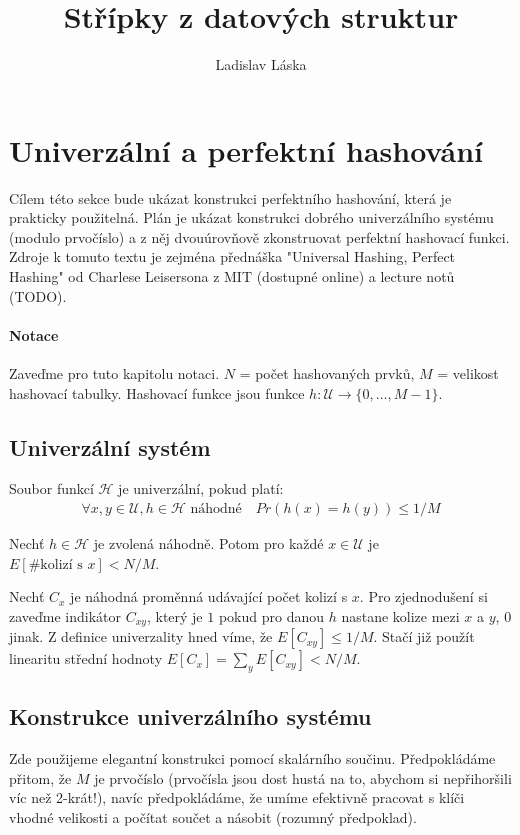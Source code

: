 \documentclass{article}
\begin{document}
\title{Střípky z datových struktur}
\author{Ladislav Láska}

\renewcommand{\H}{\mathcal{H}}
\newcommand{\U}{\mathcal{U}}

\maketitle

\section{Univerzální a perfektní hashování}
Cílem této sekce bude ukázat konstrukci perfektního hashování, která je 
prakticky použitelná. Plán je ukázat konstrukci dobrého univerzálního systému 
(modulo prvočíslo) a z něj dvouúrovňově zkonstruovat perfektní hashovací funkci.  
Zdroje k tomuto textu je zejména přednáška "Universal Hashing, Perfect Hashing" 
od Charlese Leisersona z MIT (dostupné online) a lecture notů (TODO).

\paragraph{Notace} Zaveďme pro tuto kapitolu notaci. $N$ = počet hashovaných 
prvků, $M$ = velikost hashovací tabulky. Hashovací funkce jsou funkce $h: \U \to 
\{0, \dots, M-1\}$.

\subsection{Univerzální systém}
\df Soubor funkcí $\H$ je univerzální, pokud platí:
\begin{align}
	\forall x,y\in \U, h\in \H \text{ náhodné}\quad Pr(h(x) = h(y)) \leq 1/M
\end{align}

\vt Nechť $h\in \H$ je zvolená náhodně. Potom pro každé $x\in \U$ je 
$E[\#\text{kolizí s } x] < N/M$.

\dk Nechť $C_x$ je náhodná proměnná udávající počet kolizí s $x$. Pro 
zjednodušení si zaveďme indikátor $C_{xy}$, který je $1$ pokud pro danou $h$ 
nastane kolize mezi $x$ a $y$, $0$ jinak. Z definice univerzality hned víme, že 
$E[C_{xy}] \leq 1/M$. Stačí již použít linearitu střední hodnoty $E[C_x] = 
\sum_y E[C_{xy}] < N/M$.

\subsection{Konstrukce univerzálního systému}
Zde použijeme elegantní konstrukci pomocí skalárního součinu. Předpokládáme 
přitom, že $M$ je prvočíslo (prvočísla jsou dost hustá na to, abychom si 
nepřihoršili víc než 2-krát!), navíc předpokládáme, že umíme efektivně pracovat 
s klíči vhodné velikosti a počítat součet a násobit (rozumný předpoklad).
\end{document}
